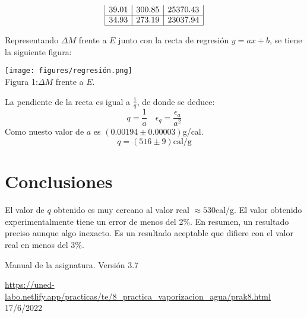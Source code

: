 \documentclass{article}
\begin{document}
\begin{multicols}{2}
\begin{center}
$$\begin{array}{|l|l|l|}
      39.01 & 300.85 & 25370.43  \\ \hline
      34.93 & 273.19 & 23037.94  \\ \hline
      \end{array}
  $$
\end{center}
Representando $\Delta M$ frente a $E$ junto con la recta de regresión $y=ax+b$, se tiene la siguiente figura:
\begin{center}
  \texttt{[image: figures/regresión.png]}\\
  Figura 1:$\Delta M$ frente a $E$.\\
  $\text{ }$\\
  $\text{ }$\\
  $\text{ }$
\end{center}
La pendiente de la recta es igual a $\frac{1}{q}$, de donde se deduce:
$$
q = \frac{1}{a} \quad \epsilon_q = \frac{\epsilon_a}{a^2}
$$
Como nuesto valor de $a$ es $(0.00194\pm0.00003)$g/cal.
$$
q = (516\pm 9) \text{cal/g}
$$
\section*{Conclusiones}
El valor de $q$ obtenido es muy cercano al valor real $\approx 530$cal/g. El valor obtenido experimentalmente tiene un error de menos del 2\%. En resumen, un resultado preciso aunque algo inexacto. Es un resultado aceptable que difiere con el valor real en menos del 3\%.

\begin{thebibliography}{1}

  Manual de la asignatura. Versión 3.7

  \url{https://uned-labo.netlify.app/practicas/te/8_practica_vaporizacion_agua/prak8.html} 17/6/2022

\end{thebibliography}
\end{multicols}
\end{document}
